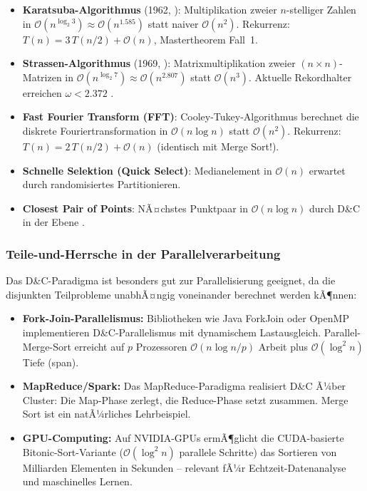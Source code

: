 ﻿\documentclass[a4paper,12pt]{article}
\theoremstyle{definition}
\begin{document}
\begin{itemize}
    \item \textbf{Karatsuba-Algorithmus} (1962, \cite{karatsuba1962}): Multiplikation
          zweier $n$-stelliger Zahlen in $\mathcal{O}(n^{\log_2 3}) \approx \mathcal{O}(n^{1.585})$
          statt naiver $\mathcal{O}(n^2)$.
          Rekurrenz: $T(n) = 3\,T(n/2) + \mathcal{O}(n)$, Mastertheorem Fall~1.
    \item \textbf{Strassen-Algorithmus} (1969, \cite{strassen1969}): Matrixmultiplikation
          zweier $(n \times n)$-Matrizen in $\mathcal{O}(n^{\log_2 7}) \approx \mathcal{O}(n^{2.807})$
          statt $\mathcal{O}(n^3)$. Aktuelle Rekordhalter erreichen $\omega < 2.372$
          \cite{williams2023}.
    \item \textbf{Fast Fourier Transform (FFT)}: Cooley-Tukey-Algorithmus \cite{cooley1965}
          berechnet die diskrete Fouriertransformation in $\mathcal{O}(n \log n)$
          statt $\mathcal{O}(n^2)$. Rekurrenz: $T(n) = 2\,T(n/2) + \mathcal{O}(n)$
          (identisch mit Merge Sort!).
    \item \textbf{Schnelle Selektion (Quick Select)}: Medianelement in
          $\mathcal{O}(n)$ erwartet durch randomisiertes Partitionieren.
    \item \textbf{Closest Pair of Points}: NÃ¤chstes Punktpaar in $\mathcal{O}(n \log n)$
          durch D\&C in der Ebene \cite{shamos1975}.
\end{itemize}

\subsubsection{Teile-und-Herrsche in der Parallelverarbeitung}

Das D\&C-Paradigma ist besonders gut zur Parallelisierung geeignet, da die
disjunkten Teilprobleme unabhÃ¤ngig voneinander berechnet werden kÃ¶nnen:

\begin{itemize}
    \item \textbf{Fork-Join-Parallelismus:} Bibliotheken wie Java ForkJoin
          oder OpenMP implementieren D\&C-Parallelismus mit dynamischem
          Lastausgleich. Parallel-Merge-Sort erreicht auf $p$ Prozessoren
          $\mathcal{O}(n \log n / p)$ Arbeit plus $\mathcal{O}(\log^2 n)$
          Tiefe (span).
    \item \textbf{MapReduce/Spark:} Das MapReduce-Paradigma \cite{dean2008}
          realisiert D\&C Ã¼ber Cluster: Die Map-Phase zerlegt, die Reduce-Phase
          setzt zusammen. Merge Sort ist ein natÃ¼rliches Lehrbeispiel.
    \item \textbf{GPU-Computing:} Auf NVIDIA-GPUs ermÃ¶glicht die CUDA-basierte
          Bitonic-Sort-Variante ($\mathcal{O}(\log^2 n)$ parallele Schritte)
          das Sortieren von Milliarden Elementen in Sekunden -- relevant fÃ¼r
          Echtzeit-Datenanalyse und maschinelles Lernen.
\end{itemize}
\end{document}

